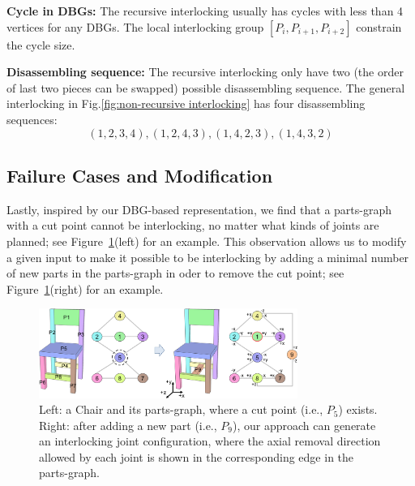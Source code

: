\vspace*{2mm}
\noindent
{\bf Cycle in DBGs: } The recursive interlocking usually has cycles with less than 4 vertices for any DBGs. The local interlocking group $[P_{i}, P_{i+1}, P_{i+2}]$ constrain the cycle size.

\vspace*{2mm}
\noindent
{\bf Disassembling sequence: } The recursive interlocking only have two (the order of last two pieces can be swapped) possible disassembling sequence. The general interlocking in Fig.\ref{fig:non-recursive interlocking} has four disassembling sequences:
\begin{equation*}
	(1, 2, 3, 4), (1, 2, 4, 3), (1, 4, 2, 3), (1, 4, 3, 2)
\end{equation*}

\subsection{Failure Cases and Modification}
\label{subsec: failurecases}
Lastly, inspired by our DBG-based representation, we find that a parts-graph with a cut point cannot be interlocking, no matter what kinds of joints are planned; see Figure~\ref{fig:Result_Furniture_Chair}(left) for an example.
This observation allows us to modify a given input to make it possible to be interlocking by adding a minimal number of new parts in the parts-graph in oder to remove the cut point; see Figure~\ref{fig:Result_Furniture_Chair}(right) for an example.

\begin{figure}[!t]
	\centering
	\includegraphics[width=8.45cm]{images/Result_Furniture_Chair.png}
	\vspace*{-2.5mm}
	\caption{
		Left: a {\textsc Chair} and its parts-graph, where a cut point (i.e., $P_5$) exists.
		Right: after adding a new part (i.e., $P_9$), our approach can generate an interlocking joint configuration, where the axial removal direction allowed by each joint is shown in the corresponding edge in the parts-graph. 
	}
	\vspace*{-4.5mm}
	\label{fig:Result_Furniture_Chair}
\end{figure}